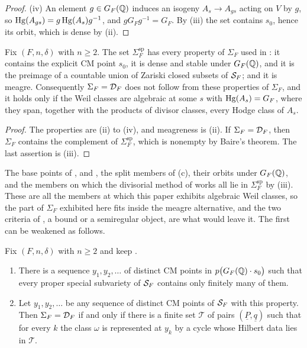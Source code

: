 \begin{proof}
(iv) An element $g\in G_{F}(\mathbb{Q})$ induces an isogeny $A_{s}\to A_{gs}$ acting
on $V$ by $g$, so $\operatorname{Hg}(A_{gs})=g\operatorname{Hg}(A_{s})g^{-1}$, and $gG_{F}g^{-1}=G_{F}$.
By (iii) the set contains $s_{0}$, hence its orbit, which is dense by
(ii).
\end{proof}

\begin{corollary}\label{cor:speciallocus}
Fix $(F,n,\delta)$ with $n\ge2$. The set $\Sigma^{\mathrm{sp}}_{F}$ has every
property of $\Sigma_{F}$ used in : it contains the explicit CM
point $s_{0}$, it is dense and stable under $G_{F}(\mathbb{Q})$, and it is the
preimage of a countable union of Zariski closed subsets of $\mathcal{S}_{F}$; and it
is meagre. Consequently $\Sigma_{F}=\mathcal{D}_{F}$ does not follow from these
properties of $\Sigma_{F}$, and it holds only if the Weil classes are
algebraic at some $s$ with $\operatorname{Hg}(A_{s})=G_{F}$, where they span, together with
the products of divisor classes, every Hodge class of $A_{s}$.
\end{corollary}

\begin{proof}
The properties are (ii) to (iv), and meagreness is
(ii). If $\Sigma_{F}=\mathcal{D}_{F}$, then $\Sigma_{F}$ contains the complement of
$\Sigma^{\mathrm{sp}}_{F}$, which is nonempty by Baire's theorem. The last
assertion is (iii).
\end{proof}

The base points of ,  and
, the split members of (c), their orbits
under $G_{F}(\mathbb{Q})$, and the members on which the divisorial method of
 works all lie in $\Sigma^{\mathrm{sp}}_{F}$ by
(iii). These are all the members at which this paper
exhibits algebraic Weil classes, so the part of $\Sigma_{F}$ exhibited here
fits inside the meagre alternative, and the two criteria of , a
bound or a semiregular object, are what would leave it. The first can be
weakened as follows.

\begin{theorem}\label{thm:escape}
Fix $(F,n,\delta)$ with $n\ge2$ and keep .
\begin{enumerate}[label=\textup{(\roman*)},leftmargin=2.6em,itemsep=2pt]
\item There is a sequence $y_{1},y_{2},\dots$ of distinct CM points in
  $p\bigl(G_{F}(\mathbb{Q})\cdot s_{0}\bigr)$ such that every proper special
  subvariety of $\mathcal{S}_{F}$ contains only finitely many of them.
\item Let $y_{1},y_{2},\dots$ be any sequence of distinct CM points of
  $\mathcal{S}_{F}$ with this property. Then $\Sigma_{F}=\mathcal{D}_{F}$ if and only if there
  is a finite set $\mathcal{T}$ of pairs $(\underline{P},\underline{q})$ such
  that for every $k$ the class $\omega$ is represented at $y_{k}$ by a cycle
  whose Hilbert data lies in $\mathcal{T}$.
\end{enumerate}
\end{theorem}

